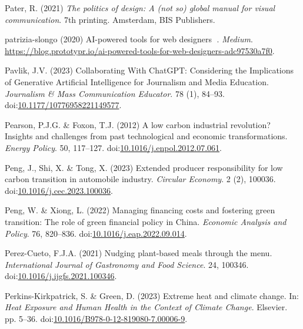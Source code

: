 \documentclass[
  letterpaper,
  DIV=11,
  numbers=noendperiod]{scrartcl}
\newlength{\cslhangindent}
\newenvironment{CSLReferences}[2] %
 {\begin{list}{}{%
  \setlength{\itemindent}{0pt}
  \setlength{\leftmargin}{0pt}
  \setlength{\parsep}{0pt}
  \ifodd #1
   \setlength{\leftmargin}{\cslhangindent}
   \setlength{\itemindent}{-1\cslhangindent}
  \fi
  \setlength{\itemsep}{#2\baselineskip}}}
 {\end{list}}
\begin{document}
\begin{CSLReferences}{0}{1}
Pater, R. (2021) \emph{The politics of design: A (not so) global manual
for visual communication}. 7th printing. Amsterdam, BIS Publishers.

patrizia-slongo (2020) {AI-powered} tools for web designers 🤖.
\emph{Medium}.
\url{https://blog.prototypr.io/ai-powered-tools-for-web-designers-adc97530a7f0}.

Pavlik, J.V. (2023) Collaborating {With ChatGPT}: {Considering} the
{Implications} of {Generative Artificial Intelligence} for {Journalism}
and {Media Education}. \emph{Journalism \& Mass Communication Educator}.
78 (1), 84--93.
doi:\href{https://doi.org/10.1177/10776958221149577}{10.1177/10776958221149577}.

Pearson, P.J.G. \& Foxon, T.J. (2012) A low carbon industrial
revolution? {Insights} and challenges from past technological and
economic transformations. \emph{Energy Policy}. 50, 117--127.
doi:\href{https://doi.org/10.1016/j.enpol.2012.07.061}{10.1016/j.enpol.2012.07.061}.

Peng, J., Shi, X. \& Tong, X. (2023) Extended producer responsibility
for low carbon transition in automobile industry. \emph{Circular
Economy}. 2 (2), 100036.
doi:\href{https://doi.org/10.1016/j.cec.2023.100036}{10.1016/j.cec.2023.100036}.

Peng, W. \& Xiong, L. (2022) Managing financing costs and fostering
green transition: {The} role of green financial policy in {China}.
\emph{Economic Analysis and Policy}. 76, 820--836.
doi:\href{https://doi.org/10.1016/j.eap.2022.09.014}{10.1016/j.eap.2022.09.014}.

Perez-Cueto, F.J.A. (2021) Nudging plant-based meals through the menu.
\emph{International Journal of Gastronomy and Food Science}. 24, 100346.
doi:\href{https://doi.org/10.1016/j.ijgfs.2021.100346}{10.1016/j.ijgfs.2021.100346}.

Perkins-Kirkpatrick, S. \& Green, D. (2023) Extreme heat and climate
change. In: \emph{Heat {Exposure} and {Human Health} in the {Context} of
{Climate Change}}. Elsevier. pp. 5--36.
doi:\href{https://doi.org/10.1016/B978-0-12-819080-7.00006-9}{10.1016/B978-0-12-819080-7.00006-9}.


\end{CSLReferences}
\end{document}
